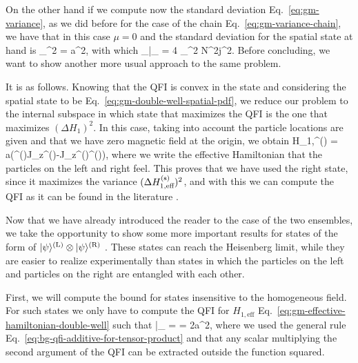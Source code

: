 On the other hand if we compute now the standard deviation Eq.~\eqref{eq:gm-variance}, as we did before for the case of the chain Eq.~\eqref{eq:gm-variance-chain},
we have that in this case $\mu=0$ and the standard deviation for the spatial state at hand is
\be
  \sigma_{}^2 = a^2,
  \label{eq:gm-variance-two-ensembles}
\ee
with which
\be
  _{}|_{\max} = 4 \sigma_{}^2 N^2j^2.
\ee
Before concluding, we want to show another more usual approach to the same problem.

It is as follows. Knowing that the QFI is convex in the state and considering the spatial state to be Eq.~\eqref{eq:gm-double-well-spatial-pdf}, we reduce our problem to the internal subspace in which state that maximizes the QFI is the one that maximizes $(\Delta H_1)^2$.
In this case, taking into account the particle locations are given and that we have zero magnetic field at the origin, we obtain
\be
  H_{1,}^{()} = a(\mtxid^{()}\otimes J_{z}^{()}-J_{z}^{()}\otimes \mtxid^{()}),
  \label{eq:gm-effective-hamiltonian-double-well}
\ee
where we write the effective Hamiltonian that the particles on the left and right feel.
This proves that we have used the right state, since it maximizes the variance $(\Delta H_{1,\text{eff}}^{(\text{s})} )^2$, and with this we can compute the QFI as it can be found in the literature \cite{Landini2014}.


Now that we have already introduced the reader to the case of the two ensembles, we take the opportunity to show some more important results for states of the form of $\vert{\psi}\rangle^{(\text{L})} \otimes \vert{\psi}\rangle^{(\text{R})}$ \cite{Landini2014}.
These states can reach the Heisenberg limit, while they are easier to realize experimentally than states in which the particles on the left and particles on the right are entangled with each other.

First, we will compute the bound for states insensitive to the homogeneous field.
For such states we only have to compute the QFI for $H_{1,\text{eff}}$ Eq.~\eqref{eq:gm-effective-hamiltonian-double-well} such that
\be
  |_{\max} = = 2a^2,
\ee
where we used the general rule Eq.~\eqref{eq:bg-qfi-additive-for-tensor-product} and that any scalar multiplying the second argument of the QFI can be extracted outside the function squared.

